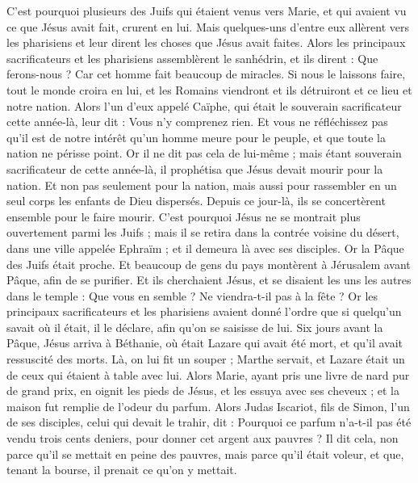 \begin{multicols}{2}
C'est pourquoi plusieurs des Juifs qui étaient venus vers Marie, et qui avaient vu ce que Jésus avait fait, crurent en lui.
Mais quelques-uns d'entre eux allèrent vers les pharisiens et leur dirent les choses que Jésus avait faites.
Alors les principaux sacrificateurs et les pharisiens assemblèrent le sanhédrin, et ils dirent : Que ferons-nous ? Car cet homme fait beaucoup de miracles.
Si nous le laissons faire, tout le monde croira en lui, et les Romains viendront et ils détruiront et ce lieu et notre nation.
Alors l'un d'eux appelé Caïphe, qui était le souverain sacrificateur cette année-là, leur dit : Vous n'y comprenez rien.
Et vous ne réfléchissez pas qu'il est de notre intérêt qu'un homme meure pour le peuple, et que toute la nation ne périsse point.
Or il ne dit pas cela de lui-même ; mais étant souverain sacrificateur de cette année-là, il prophétisa que Jésus devait mourir pour la nation.
Et non pas seulement pour la nation, mais aussi pour rassembler en un seul corps les enfants de Dieu dispersés.
Depuis ce jour-là, ils se concertèrent ensemble pour le faire mourir.
C'est pourquoi Jésus ne se montrait plus ouvertement parmi les Juifs ; mais il se retira dans la contrée voisine du désert, dans une ville appelée Ephraïm ; et il demeura là avec ses disciples.
Or la Pâque des Juifs était proche. Et beaucoup de gens du pays montèrent à Jérusalem avant Pâque, afin de se purifier.
Et ils cherchaient Jésus, et se disaient les uns les autres dans le temple : Que vous en semble ? Ne viendra-t-il pas à la fête ?
Or les principaux sacrificateurs et les pharisiens avaient donné l'ordre que si quelqu'un savait où il était, il le déclare, afin qu'on se saisisse de lui.
\VerseOne{}Six jours avant la Pâque, Jésus arriva à Béthanie, où était Lazare qui avait été mort, et qu'il avait ressuscité des morts.
Là, on lui fit un souper ; Marthe servait, et Lazare était un de ceux qui étaient à table avec lui.
Alors Marie, ayant pris une livre de nard pur de grand prix, en oignit les pieds de Jésus, et les essuya avec ses cheveux ; et la maison fut remplie de l'odeur du parfum.
Alors Judas Iscariot, fils de Simon, l'un de ses disciples, celui qui devait le trahir, dit :
Pourquoi ce parfum n'a-t-il pas été vendu trois cents deniers, pour donner cet argent aux pauvres ?
Il dit cela, non parce qu'il se mettait en peine des pauvres, mais parce qu'il était voleur, et que, tenant la bourse, il prenait ce qu'on y mettait.

\end{multicols}
